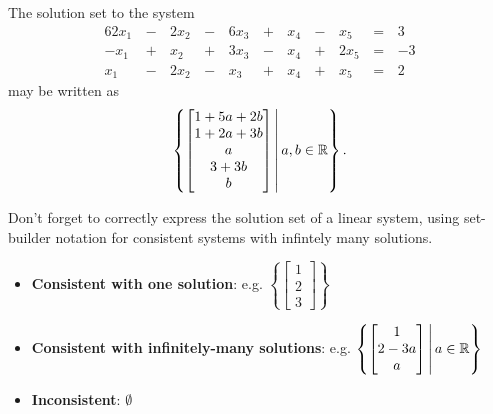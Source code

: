 \begin{applicationActivities}
\begin{observation}
The solution set to the system
\begin{alignat*}{6}
2x_1&\,-\,&2x_2&\,-\,&6x_3&\,+\,&x_4&\,-\,&x_5&\,=\,&3 \\
-x_1&\,+\,&x_2&\,+\,&3x_3&\,-\,&x_4&\,+\,&2x_5 &\,=\,& -3 \\
x_1&\,-\,&2x_2&\,-\,&x_3&\,+\,&x_4&\,+\,&x_5 &\,=\,& 2
\end{alignat*}
may be written as
\[
  \left\{
    \begin{bmatrix}
      1+5a+2b \\
      1+2a+3b \\
      a \\
      3+3b \\
      b
    \end{bmatrix}
  \,\middle|\,
    a,b\in \mathbb{R}
  \right\}
.\]
\end{observation}

\begin{remark}
Don't forget to correctly express the solution set of a linear system,
using set-builder notation for consistent systems with
infintely many solutions.
  \begin{itemize}
  \item \textbf{Consistent with one solution}: e.g.
        \(\left\{\begin{bmatrix}1\\2\\3\end{bmatrix}\right\}\)
  \item \textbf{Consistent with infinitely-many solutions}: e.g.
        \(
          \left\{
            \begin{bmatrix}1\\2-3a\\a\end{bmatrix}
          \,\middle|\,
            a\in\mathbb{R}
          \right\}
        \)
  \item \textbf{Inconsistent}: \(\emptyset\)
  \end{itemize}
\end{remark}

\end{applicationActivities}

